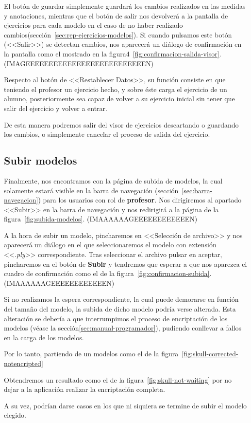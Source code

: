 El botón de guardar simplemente guardará los cambios realizados en las medidas y anotaciones, mientras que el botón de salir nos devolverá a la pantalla de ejercicios para cada modelo en el caso de no haber realizado cambios(sección~\ref{sec:rep-ejercicios-modelos}). Si cuando pulsamos este botón (<<Salir>>) se detectan cambios, nos aparecerá un diálogo de confirmación en la pantalla como el mostrado en la figura4~\ref{fig:confirmacion-salida-visor}.
(IMAGEEEEEEEEEEEEEEEEEEEEEEEEEEN)

Respecto al botón de <<Restablecer Datos>>, su función consiste en que teniendo el profesor un ejercicio hecho, y sobre éste carga el ejercicio de un alumno, posteriormente sea capaz de volver a su ejercicio inicial sin tener que salir del ejercicio y volver a entrar.

De esta manera podremos salir del visor de ejercicios descartando o guardando los cambios, o simplemente cancelar el proceso de salida del ejercicio.

\subsection{Subir modelos}\label{sec:subir-modelos}
Finalmente, nos encontramos con la página de subida de modelos, la cual solamente estará visible en la barra de navegación (sección~\ref{sec:barra-navegacion}) para los usuarios con rol de \textbf{profesor}. Nos dirigiremos al apartado <<Subir>> en la barra de navegación y nos redirigirá a la página de la figura~\ref{fig:subida-modelos}.
(IMAAAAAAGEEEEEEEEEEEEN)

A la hora de subir un modelo, pincharemos en <<Selección de archivo>> y nos aparecerá un diálogo en el que seleccionaremos el modelo con extensión <<\textit{.ply}>> correspondiente. Tras seleccionar el archivo pulsar en aceptar, pincharemos en el botón de \textbf{Subir} y tendremos que esperar a que nos aparezca el cuadro de confirmación como el de la figura~\ref{fig:confirmacion-subida}.
(IMAAAAAAGEEEEEEEEEEEEN)

Si no realizamos la espera correspondiente, la cual puede demorarse en función del tamaño del modelo, la subida de dicho modelo podría verse alterada. Esta alteración se debería a que interrumpimos el proceso de encriptación de los modelos (véase la sección\ref{sec:manual-programador}), pudiendo conllevar a fallos en la carga de los modelos.

Por lo tanto, partiendo de un modelos como el de la figura~\ref{fig:skull-corrected-notencripted}

Obtendremos un resultado como el de la figura~\ref{fig:skull-not-waiting} por no dejar a la aplicación realizar la encriptación completa.

A su vez, podrían darse casos en los que ni siquiera se termine de subir el modelo elegido.